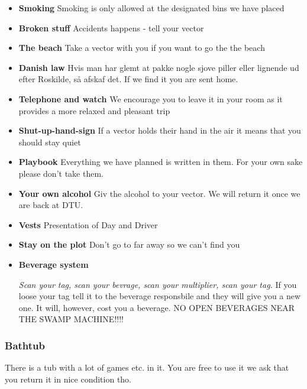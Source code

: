 \documentclass[../../../main.tex]{subfiles}
\begin{document}
\begin{itemize}
    \item \textbf{Smoking}
    Smoking is only allowed at the designated bins we have placed
    
    \item \textbf{Broken stuff}
    Accidents happens - tell your vector
    
    \item \textbf{The beach}
    Take a vector with you if you want to go the the beach
    
    \item \textbf{Danish law}
    Hvis man har glemt at pakke nogle sjove piller eller lignende ud efter Roskilde, så afskaf det. If we find it you are sent home.
    
    
    \item \textbf{Telephone and watch}
    We encourage you to leave it in your room as it provides a more relaxed and pleasant trip
    
    \item \textbf{Shut-up-hand-sign}
    If a vector holds their hand in the air it means that you should stay quiet
    
    \item \textbf{Playbook}
    Everything we have planned is written in them. For your own sake please don't take them.
    
    \item \textbf{Your own alcohol}
    Giv the alcohol to your vector. We will return it once we are back at DTU.
    
    \item \textbf{Vests}
    Presentation of Day and Driver
    
    \item \textbf{Stay on the plot}
    Don't go to far away so we can't find you
    
    \item \textbf{Beverage system}
    
    \textit{Scan your tag, scan your bevrage, scan your multiplier, scan your tag.}
    If you loose your tag tell it to the beverage responsbile and they will give you a new one. It will, however, cost you a beverage. NO OPEN BEVERAGES NEAR THE SWAMP MACHINE!!!!
\end{itemize}

\subsubsection{Bathtub}
There is a tub with a lot of games etc. in it. You are free to use it we ask that you return it in nice condition tho.
\end{document}
